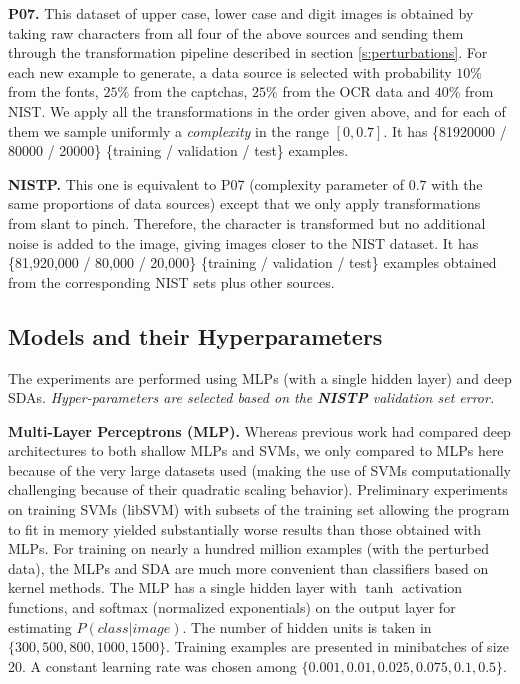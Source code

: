 \documentclass{article} %
\begin{document}
{\bf P07.} This dataset of upper case, lower case and digit images
is obtained by taking raw characters from all four of the above sources
and sending them through the transformation pipeline described in section \ref{s:perturbations}.
For each new example to generate, a data source is selected with probability $10\%$ from the fonts,
$25\%$ from the captchas, $25\%$ from the OCR data and $40\%$ from NIST. We apply all the transformations in the
order given above, and for each of them we sample uniformly a \emph{complexity} in the range $[0,0.7]$.
It has \{81920000 / 80000 / 20000\} \{training / validation / test\} examples.
\vspace*{-1mm}

{\bf NISTP.} This one is equivalent to P07 (complexity parameter of $0.7$ with the same proportions of data sources)
  except that we only apply
  transformations from slant to pinch. Therefore, the character is
  transformed but no additional noise is added to the image, giving images
  closer to the NIST dataset. 
It has \{81,920,000 / 80,000 / 20,000\} \{training / validation / test\} examples
obtained from the corresponding NIST sets plus other sources.

\vspace*{-3mm}
\subsection{Models and their Hyperparameters}
\vspace*{-2mm}

The experiments are performed using MLPs (with a single
hidden layer) and deep SDAs.
\emph{Hyper-parameters are selected based on the {\bf NISTP} validation set error.}

{\bf Multi-Layer Perceptrons (MLP).}
Whereas previous work had compared deep architectures to both shallow MLPs and
SVMs, we only compared to MLPs here because of the very large datasets used
(making the use of SVMs computationally challenging because of their quadratic
scaling behavior). Preliminary experiments on training SVMs (libSVM) with subsets of the training
set allowing the program to fit in memory yielded substantially worse results
than those obtained with MLPs. For training on nearly a hundred million examples
(with the perturbed data), the MLPs and SDA are much more convenient than
classifiers based on kernel methods.
The MLP has a single hidden layer with $\tanh$ activation functions, and softmax (normalized
exponentials) on the output layer for estimating $P(class | image)$.
The number of hidden units is taken in $\{300,500,800,1000,1500\}$. 
Training examples are presented in minibatches of size 20. A constant learning
rate was chosen among $\{0.001, 0.01, 0.025, 0.075, 0.1, 0.5\}$.
\vspace*{-1mm}
\end{document}
